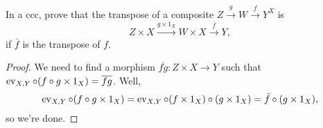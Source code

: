 \begin{exercise}{49}
    In a ccc, prove that the transpose of a composite $Z\xrightarrow{g}W\xrightarrow{f}Y^X$ is 
    \[ Z\times X\xrightarrow{g\times 1_X}W\times X\xrightarrow{\bar{f}}Y, \]
    if $\bar{f}$ is the transpose of $f$.
\end{exercise}
\begin{solution}
    \begin{proof}
        We need to find a morphism $\overline{fg}\colon Z\times X\to Y$ such that $\operatorname{ev}_{X,Y}\circ (f\circ g\times 1_X) = \overline{fg}$.
        Well, 
        \[ \operatorname{ev}_{X,Y}\circ (f\circ g\times 1_X)=\operatorname{ev}_{X,Y}\circ(f\times 1_X)\circ (g\times 1_X)=\bar{f}\circ (g\times 1_X), \]
        so we're done.
    \end{proof}
\end{solution}


